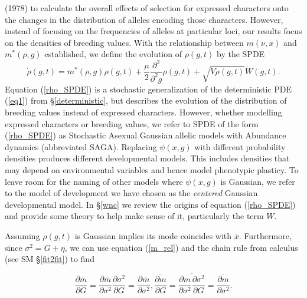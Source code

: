 \documentclass[]{article}
\begin{document}
(1978) to calculate the overall effects of selection for expressed
characters onto the changes in the distribution of alleles encoding
those characters. However, instead of focusing on the frequencies of
alleles at particular loci, our results focus on the densities of
breeding values. With the relationship between \(m(\nu,x)\) and
\(m^*(\rho,g)\) established, we define the evolution of \(\rho(g,t)\) by
the SPDE \begin{equation}\label{rho_SPDE}
\dot\rho(g,t)=m^*(\rho,g)\rho(g,t)+\frac{\mu}{2}\frac{\partial^2}{\partial^2 g}\rho(g,t)+\sqrt{V\rho(g,t)}\dot W(g,t).
\end{equation} Equation (\ref{rho_SPDE}) is a stochastic generalization
of the deterministic PDE (\ref{eq1}) from \S\ref{deterministic}, but
describes the evolution of the distribution of breeding values instead
of expressed characters. However, whether modelling expressed characters
or breeding values, we refer to SPDE of the form (\ref{rho_SPDE}) as
Stochastic Asexual Gaussian allelic models with Abundance dynamics
(abbreviated SAGA). Replacing \(\psi(x,g)\) with different probability
densities produces different developmental models. This includes
densities that may depend on environmental variables and hence model
phenotypic plasticy. To leave room for the naming of other models where
\(\psi(x,g)\) is Gaussian, we refer to the model of development we have
chosen as the \emph{centered} Gaussian developmental model. In
\S\ref{wnc} we review the origins of equation (\ref{rho_SPDE}) and
provide some theory to help make sense of it, particularly the term
\(\dot W\).

Assuming \(\rho(g,t)\) is Gaussian implies its mode coincides with
\(\bar x\). Furthermore, since \(\sigma^2=G+\eta\), we can use equation
(\ref{m_rel}) and the chain rule from calculus (see SM \S\ref{fit2fit})
to find

\begin{subequations}
\begin{equation}
\frac{\partial\bar m}{\partial G}=\frac{\partial\bar m}{\partial\sigma^2}\frac{\partial\sigma^2}{\partial G}=\frac{\partial\bar m}{\partial\sigma^2},
\end{equation}
\begin{equation}
\overline{\frac{\partial m}{\partial G}}=\overline{\frac{\partial m}{\partial\sigma^2}\frac{\partial\sigma^2}{\partial G}}=\overline{\frac{\partial m}{\partial\sigma^2}}.
\end{equation}
\end{subequations}
\end{document}
